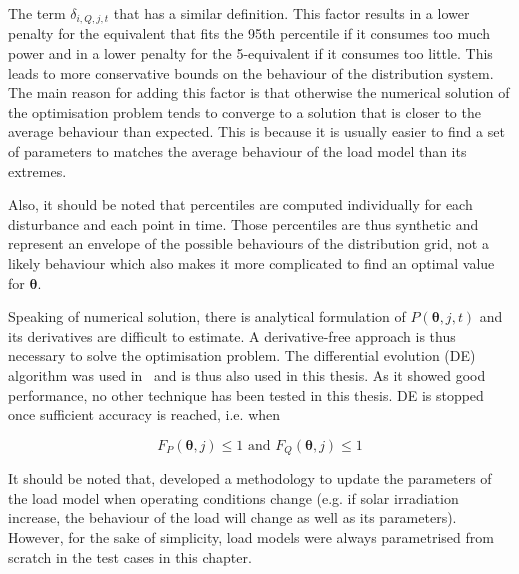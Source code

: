 The term \(\delta_{i, Q, j, t}\) that has a similar definition. This factor results in a lower penalty for the equivalent that fits the 95th percentile if it consumes too much power and in a lower penalty for the 5-equivalent if it consumes too little. This leads to more conservative bounds on the behaviour of the distribution system. The main reason for adding this factor is that otherwise the numerical solution of the optimisation problem tends to converge to a solution that is closer to the average behaviour than expected. This is because it is usually easier to find a set of parameters to matches the average behaviour of the load model than its extremes.

Also, it should be noted that percentiles are computed individually for each disturbance and each point in time. Those percentiles are thus synthetic and represent an envelope of the possible behaviours of the distribution grid, not a likely behaviour which also makes it more complicated to find an optimal value for \(\bm{\theta}\).

Speaking of numerical solution, there is analytical formulation of \(P(\bm{\theta}, j, t)\) and its derivatives are difficult to estimate. A derivative-free approach is thus necessary to solve the optimisation problem. The differential evolution (DE) algorithm was used in~\cite{ChaspierreThesis, ChaspierrePaper} and is thus also used in this thesis. As it showed good performance, no other technique has been tested in this thesis. DE is stopped once sufficient accuracy is reached, i.e. when

\begin{equation}
    \label{eq:equivalent_stop}
    F_P(\bm{\theta}, j) \leq 1 \text{ and } F_Q(\bm{\theta}, j) \leq 1
\end{equation}

It should be noted that, \cite{ChaspierreThesis} developed a methodology to update the parameters of the load model when operating conditions change (e.g. if solar irradiation increase, the behaviour of the load will change as well as its parameters). However, for the sake of simplicity, load models were always parametrised from scratch in the test cases in this chapter.


